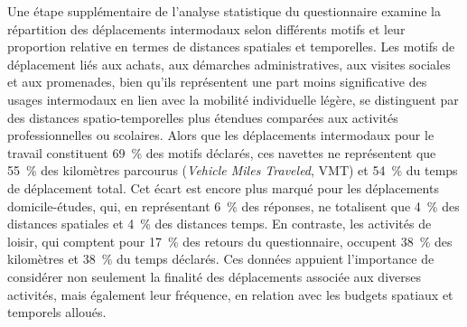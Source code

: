 \begin{refsegment}
Une étape supplémentaire de l'analyse statistique du questionnaire examine la répartition des déplacements intermodaux selon différents motifs et leur proportion relative en termes de distances spatiales et temporelles. Les motifs de déplacement liés aux achats, aux démarches administratives, aux visites sociales et aux promenades, bien qu'ils représentent une part moins significative des usages intermodaux en lien avec la mobilité individuelle légère, se distinguent par des distances spatio-temporelles plus étendues comparées aux activités professionnelles ou scolaires. Alors que les déplacements intermodaux pour le travail constituent 69~\% des motifs déclarés, ces navettes ne représentent que 55~\% des kilomètres parcourus (\textsl{Vehicle Miles Traveled}, VMT) et 54~\% du temps de déplacement total. Cet écart est encore plus marqué pour les déplacements domicile-études, qui, en représentant 6~\% des réponses, ne totalisent que 4~\% des distances spatiales et 4~\% des distances temps. En contraste, les activités de loisir, qui comptent pour 17~\% des retours du questionnaire, occupent 38~\% des kilomètres et 38~\% du temps déclarés. Ces données appuient l'importance de considérer non seulement la finalité des déplacements associée aux diverses activités, mais également leur fréquence, en relation avec les budgets spatiaux et temporels alloués.%


\end{refsegment}

